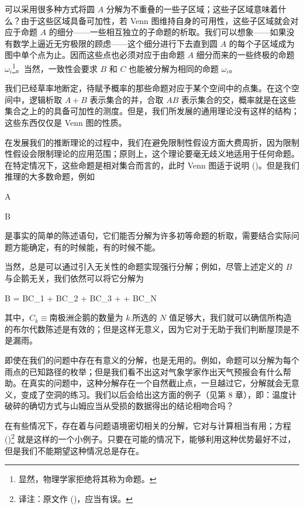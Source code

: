 可以采用很多种方式将圆 $A$ 分解为不重叠的一些子区域；这些子区域意味着什么？由于这些区域具备可加性，若 Venn 图维持自身的可用性，这些子区域就会对应于命题 $A$ 的细分——一些相互独立的子命题的析取。我们可以想象——如果没有数学上逼近无穷极限的顾虑——这个细分进行下去直到圆 $A$ 的每个子区域成为图中单个点为止。因而这些点也必须对应于由命题 $A$ 细分而来的一些终极的命题 $\omega_i$\footnote{显然，物理学家拒绝将其称为命题。}。当然，一致性会要求 $B$ 和 $C$ 也能被分解为相同的命题 $\omega_i$。

我们已经草率地断定，待赋予概率的那些命题对应于某个空间中的点集。在这个空间中，逻辑析取 $A + B$ 表示集合的并，合取 $AB$ 表示集合的交，概率就是在这些集合之上的的具备可加性的测度。但是，我们所发展的通用理论没有这样的结构；这些东西仅仅是 Venn 图的性质。

在发展我们的推断理论的过程中，我们在避免限制性假设方面大费周折，因为限制性假设会限制理论的应用范围；原则上，这个理论要毫无歧义地适用于任何命题。在特定情况下，这些命题是相对集合而言的，此时 Venn 图适于说明 (\in[2-104])。但是我们推理的大多数命题，例如

\placeformula[2-105]
\startformula
A \equiv {}
\stopformula

\placeformula[2-106]
\startformula
B \equiv {}
\stopformula

是事实的简单的陈述语句，它们能否分解为许多初等命题的析取，需要结合实际问题方能确定，有的时候能，有的时候不能。

当然，总是可以通过引入无关性的命题实现强行分解；例如，尽管上述定义的 $B$ 与企鹅无关，我们依然可以将它分解为

\placeformula[2-107]
\startformula
B = BC_1 + BC_2 + BC_3 + \cdots + BC_N
\stopformula

其中，$C_k\equiv\text{南极洲企鹅的数量为 }k$.所选的 $N$ 值足够大，我们就可以确信所构造的布尔代数陈述是有效的；但是这样无意义，因为它对于无助于我们判断屋顶是不是漏雨。

即使在我们的问题中存在有意义的分解，也是无用的。例如，命题可以分解为每个雨点的已知路径的枚举；但是我们看不出这对气象学家作出天气预报会有什么帮助。在真实的问题中，这种分解存在一个自然截止点，一旦越过它，分解就会无意义，变成了空洞的练习。我们以后会给出这方面的例子（见第 8 章），即：温度计破碎的确切方式与山姆应当从受损的数据得出的结论相吻合吗？

在有些情况下，存在着与问题语境密切相关的分解，它对与计算相当有用；方程 (\in[2-97])\footnote{译注：原文作 (\in[2-98])，应当有误。} 就是这样的一个小例子。只要在可能的情况下，能够利用这种优势最好不过，但是我们不能期望这种情况总是存在。

